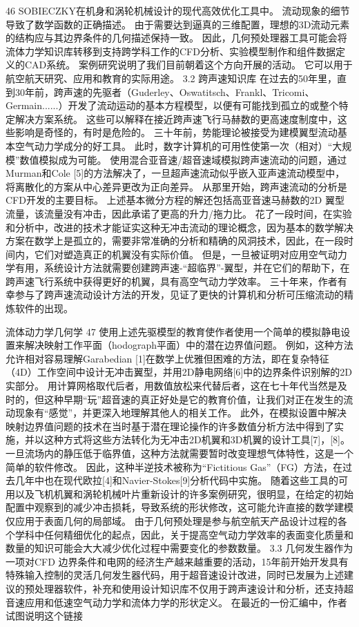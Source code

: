 \documentclass[UTF8,11pt,a4paper,openany,fontset=fandol]{ctexbook}
\begin{document}
46 SOBIECZKY在机身和涡轮机械设计的现代高效优化工具中。 流动现象的细节导致了数学函数的正确描述。 由于需要达到逼真的三维配置，理想的3D流动元素的结构应与其边界条件的几何描述保持一致。 因此，几何预处理器工具可能会将流体力学知识库转移到支持跨学科工作的CFD分析、实验模型制作和组件数据定义的CAD系统。 案例研究说明了我们目前朝着这个方向开展的活动。 它可以用于航空航天研究、应用和教育的实际用途。 3.2 跨声速知识库 在过去的50年里，直到30年前，跨声速的先驱者（Guderley、Oswatitsch、Frankl、Tricomi、Germain......）开发了流动运动的基本方程模型，以便有可能找到孤立的或整个特定解决方案系统。 这些可以解释在接近跨声速飞行马赫数的更高速度制度中，这些影响是奇怪的，有时是危险的。 三十年前，势能理论被接受为建模翼型流动基本空气动力学成分的好工具。 此时，数字计算机的可用性使第一次（相对）“大规模”数值模拟成为可能。 使用混合亚音速/超音速域模拟跨声速流动的问题，通过Murman和Cole [5]的方法解决了，一旦超声速流动似乎嵌入亚声速流动模型中，将离散化的方案从中心差异更改为正向差异。 从那里开始，跨声速流动的分析是CFD开发的主要目标。 上述基本微分方程的解还包括高亚音速马赫数的2D 翼型流量，该流量没有冲击，因此承诺了更高的升力/拖力比。 花了一段时间，在实验和分析中，改进的技术才能证实这种无冲击流动的理论概念，因为基本的数学解决方案在数学上是孤立的，需要非常准确的分析和精确的风洞技术，因此，在一段时间内，它们对塑造真正的机翼没有实际价值。 但是，一旦被证明对应用空气动力学有用，系统设计方法就需要创建跨声速-“超临界”-翼型，并在它们的帮助下，在跨声速飞行系统中获得更好的机翼，具有高空气动力学效率。 三十年来，作者有幸参与了跨声速流动设计方法的开发，见证了更快的计算机和分析可压缩流动的精炼软件的出现。

流体动力学几何学 47 使用上述先驱模型的教育使作者使用一个简单的模拟静电设置来解决映射工作平面（hodograph平面）中的潜在边界值问题。 例如，这种方法允许相对容易理解Garabedian [1]在数学上优雅但困难的方法，即在复杂特征（4D）工作空间中设计无冲击翼型，并用2D静电网络[6]中的边界条件识别解的2D实部分。 用计算网格取代后者，用数值放松来代替后者，这在七十年代当然是及时的，但这种早期“玩”超音速的真正好处是它的教育价值，让我们对正在发生的流动现象有“感觉”，并更深入地理解其他人的相关工作。 此外，在模拟设置中解决映射边界值问题的技术在当时基于潜在理论操作的许多数值分析方法中得到了实施，并以这种方式将这些方法转化为无冲击2D机翼和3D机翼的设计工具[7]，[8]。 一旦流场内的静压低于临界值，这种方法就需要暂时改变理想气体特性，这是一个简单的软件修改。 因此，这种半逆技术被称为“Fictitious Gas”（FG）方法，在过去几年中也在现代欧拉[4]和Navier-Stokes[9]分析代码中实施。 随着这些工具的可用以及飞机机翼和涡轮机械叶片重新设计的许多案例研究，很明显，在给定的初始配置中观察到的减少冲击损耗，导致系统的形状修改，这可能允许直接的数学建模仅应用于表面几何的局部域。 由于几何预处理是参与航空航天产品设计过程的各个学科中任何精细优化的起点，因此，关于提高空气动力学效率的表面变化质量和数量的知识可能会大大减少优化过程中需要变化的参数数量。 3.3 几何发生器作为一项对CFD 边界条件和电网的经济生产越来越重要的活动，15年前开始开发具有特殊输入控制的灵活几何发生器代码，用于超音速设计改进，同时已发展为上述建议的预处理器软件，补充和使用设计知识库不仅用于跨声速设计和分析，还支持超音速应用和低速空气动力学和流体力学的形状定义。 在最近的一份汇编中，作者试图说明这个链接
\end{document}
